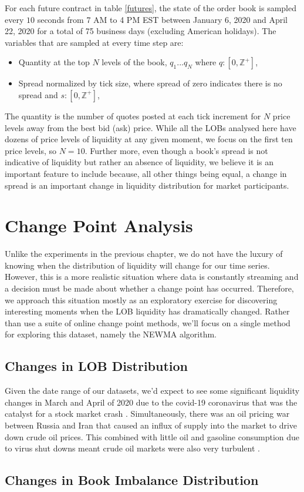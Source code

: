 For each future contract in table \ref{futures}, the state of the order book is sampled every $10$ seconds from 7 AM to 4 PM EST between January 6, 2020 and April 22, 2020 for a total of 75 business days (excluding American holidays). The variables that are sampled at every time step are:
\begin{itemize}
\item Quantity at the top $N$ levels of the book, $q_1 ... q_N$ where $q: [0, \mathbb{Z}^+]$, 
\item Spread normalized by tick size, where spread of zero indicates there is no spread and $s: [0, \mathbb{Z}^+]$, 
\end{itemize}

The quantity is the number of quotes posted at each tick increment for $N$ price levels away from the best bid (ask) price. While all the LOBs analysed here have dozens of price levels of liquidity at any given moment, we focus on the first ten price levels, so $N=10$. Further more, even though a book's spread is not indicative of liquidity but rather an absence of liquidity, we believe it is an important feature to include because, all other things being equal, a change in spread is an important change in liquidity distribution for market participants. 

\section{Change Point Analysis}
Unlike the experiments in the previous chapter, we do not have the luxury of knowing when the distribution of liquidity will change for our time series. However, this is a more realistic situation where data is constantly streaming and a decision must be made about whether a change point has occurred. Therefore, we approach this situation mostly as an exploratory exercise for discovering interesting moments when the LOB liquidity has dramatically changed. Rather than use a suite of online change point methods, we'll focus on a single method for exploring this dataset, namely the NEWMA algorithm.

\subsection{Changes in LOB Distribution}
Given the date range of our datasets, we'd expect to see some significant liquidity changes in March and April of 2020 due to the covid-19 coronavirus that was the catalyst for a stock market crash \cite{gormsen2020coronavirus}. Simultaneously, there was an oil pricing war between Russia and Iran that caused an influx of supply into the market to drive down crude oil prices. This combined with little oil and gasoline consumption due to virus shut downs meant crude oil markets were also very turbulent \cite{albulescu2020coronavirus}.

\subsection{Changes in Book Imbalance Distribution}


